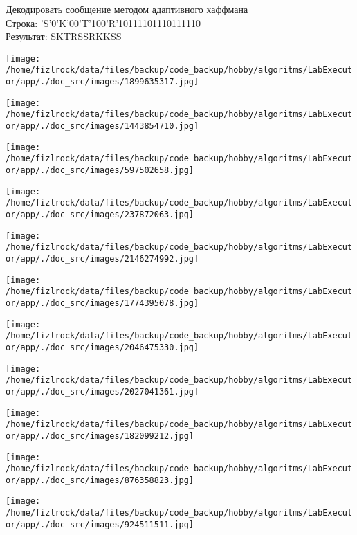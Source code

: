 \documentclass[a4paper, 12pt]{article}
\begin{document}
Декодировать сообщение методом адаптивного хаффмана \\
Строка: 
'S'0'K'00'T'100'R'10111101110111110\\
Результат: SKTRSSRKKSS

\texttt{[image: /home/fizlrock/data/files/backup/code\_backup/hobby/algoritms/LabExecutor/app/./doc\_src/images/1899635317.jpg]}

\texttt{[image: /home/fizlrock/data/files/backup/code\_backup/hobby/algoritms/LabExecutor/app/./doc\_src/images/1443854710.jpg]}

\texttt{[image: /home/fizlrock/data/files/backup/code\_backup/hobby/algoritms/LabExecutor/app/./doc\_src/images/597502658.jpg]}

\texttt{[image: /home/fizlrock/data/files/backup/code\_backup/hobby/algoritms/LabExecutor/app/./doc\_src/images/237872063.jpg]}

\texttt{[image: /home/fizlrock/data/files/backup/code\_backup/hobby/algoritms/LabExecutor/app/./doc\_src/images/2146274992.jpg]}

\texttt{[image: /home/fizlrock/data/files/backup/code\_backup/hobby/algoritms/LabExecutor/app/./doc\_src/images/1774395078.jpg]}

\texttt{[image: /home/fizlrock/data/files/backup/code\_backup/hobby/algoritms/LabExecutor/app/./doc\_src/images/2046475330.jpg]}

\texttt{[image: /home/fizlrock/data/files/backup/code\_backup/hobby/algoritms/LabExecutor/app/./doc\_src/images/2027041361.jpg]}

\texttt{[image: /home/fizlrock/data/files/backup/code\_backup/hobby/algoritms/LabExecutor/app/./doc\_src/images/182099212.jpg]}

\texttt{[image: /home/fizlrock/data/files/backup/code\_backup/hobby/algoritms/LabExecutor/app/./doc\_src/images/876358823.jpg]}

\texttt{[image: /home/fizlrock/data/files/backup/code\_backup/hobby/algoritms/LabExecutor/app/./doc\_src/images/924511511.jpg]}
\pagebreak
\end{document}
